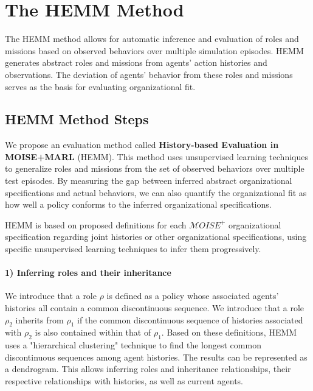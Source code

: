 \documentclass[sigconf,anonymous]{aamas}
\begin{document}
\section{The HEMM Method}
\label{sec:hemm_algorithm}
The HEMM method allows for automatic inference and evaluation of roles and missions based on observed behaviors over multiple simulation episodes. HEMM generates abstract roles and missions from agents' action histories and observations. The deviation of agents' behavior from these roles and missions serves as the basis for evaluating organizational fit.

\subsection{HEMM Method Steps}

%     

We propose an evaluation method called \textbf{History-based Evaluation in MOISE+MARL} (HEMM). This method uses unsupervised learning techniques to generalize roles and missions from the set of observed behaviors over multiple test episodes. By measuring the gap between inferred abstract organizational specifications and actual behaviors, we can also quantify the organizational fit as how well a policy conforms to the inferred organizational specifications.

HEMM is based on proposed definitions for each $\mathcal{M}OISE^+$ organizational specification regarding joint histories or other organizational specifications, using specific unsupervised learning techniques to infer them progressively.

\paragraph{\textbf{1) Inferring roles and their inheritance}}

We introduce that a role $\rho$ is defined as a policy whose associated agents' histories all contain a common discontinuous sequence. We introduce that a role $\rho_2$ inherits from $\rho_1$ if the common discontinuous sequence of histories associated with $\rho_2$ is also contained within that of $\rho_1$.
Based on these definitions, HEMM uses a "hierarchical clustering" technique to find the longest common discontinuous sequences among agent histories. The results can be represented as a dendrogram. This allows inferring roles and inheritance relationships, their respective relationships with histories, as well as current agents.
\end{document}
